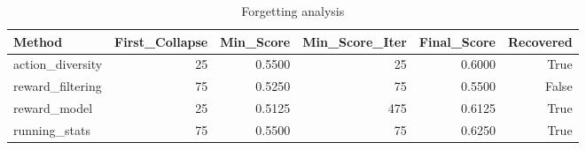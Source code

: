 \begin{table}[htbp]
\centering
\caption{Forgetting analysis}
\label{tab:forgetting}
\begin{tabular}{lrrrrr}
\toprule
\textbf{Method} & \textbf{First\_Collapse} & \textbf{Min\_Score} & \textbf{Min\_Score\_Iter} & \textbf{Final\_Score} & \textbf{Recovered} \\
\midrule
action\_diversity & 25 & 0.5500 & 25 & 0.6000 & True \\
reward\_filtering & 75 & 0.5250 & 75 & 0.5500 & False \\
reward\_model & 25 & 0.5125 & 475 & 0.6125 & True \\
running\_stats & 75 & 0.5500 & 75 & 0.6250 & True \\
\bottomrule
\end{tabular}
\end{table}